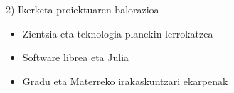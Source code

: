 \documentclass[
 10pt,%
 compress,%
 t,       %
 xcolor=svgnames
]{beamer}
\theoremstyle{definition} \newtheorem{definicion}{Definicion}[section]
\theoremstyle{propiedades} \newtheorem{propiedades}{Propiedades}[section]
\begin{document}


\begin{frame}{2) Ikerketa proiektuaren balorazioa}
	
	
\bigskip

	
	
\begin{itemize}
	\item[1)] Zientzia eta teknologia planekin lerrokatzea
	
	\medskip
	\item[2)] Software librea eta Julia
	
	\medskip
	\item[3)] Gradu eta Materreko irakaskuntzari ekarpenak
\end{itemize}
	




\end{frame}

\end{document}
